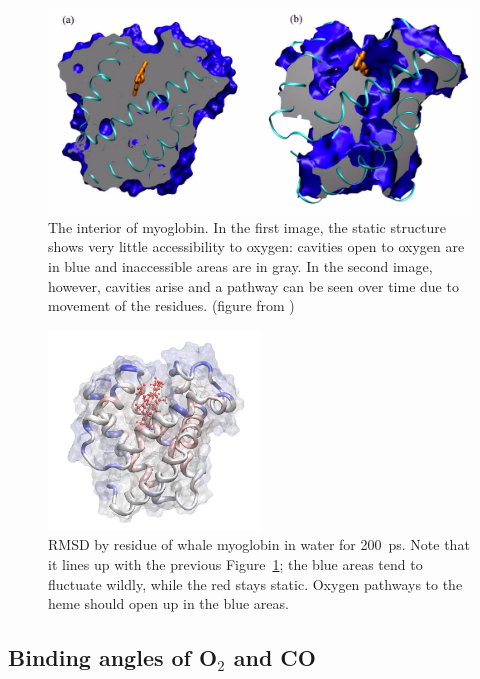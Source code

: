 \documentclass{article}
\begin{document}
\begin{figure}
  \centering
  \includegraphics[width=\textwidth]{interior.png}
  \caption{The interior of myoglobin.  In the first image, the static structure shows very little accessibility to oxygen: cavities open to oxygen are in blue and inaccessible areas are in gray.  In the second image, however, cavities arise and a pathway can be seen over time due to movement of the residues. (figure from \cite{tutorial})}
  \label{fig:uiuc}
\end{figure}

\begin{figure}
  \centering
  \includegraphics[width=0.5\textwidth]{beta.png}
  \caption{RMSD by residue of whale myoglobin in water for \SI{200}{\pico\second}.  Note that it lines up with the previous Figure~\ref{fig:uiuc}; the blue areas tend to fluctuate wildly, while the red stays static.  Oxygen pathways to the heme should open up in the blue areas.}
  \label{fig:beta}
\end{figure}

\subsection{Binding angles of O$_2$ and CO}
\end{document}
